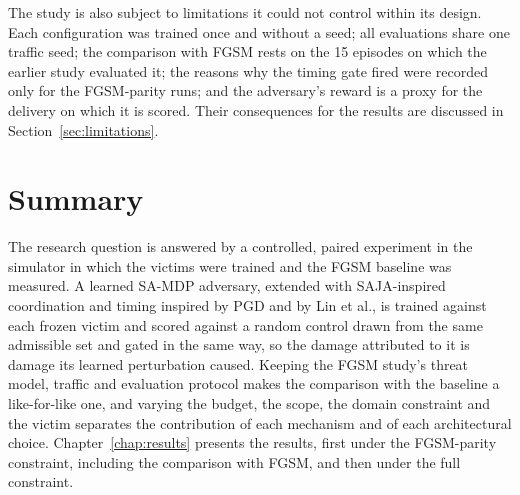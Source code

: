 The study is also subject to limitations it could not control within its design. Each
configuration was trained once and without a seed; all evaluations share one traffic
seed; the comparison with FGSM rests on the 15 episodes on which the earlier study
evaluated it; the reasons why the timing gate fired were recorded only for the
FGSM-parity runs; and the adversary's reward is a proxy for the delivery on which it is
scored. Their consequences for the results are discussed in
Section~\ref{sec:limitations}.

\section{Summary}
\label{sec:method_summary}

The research question is answered by a controlled, paired experiment in the simulator
in which the victims were trained and the FGSM baseline was measured. A learned SA-MDP
adversary, extended with SAJA-inspired coordination and timing inspired by PGD and by
Lin et al., is trained
against each frozen victim and scored against a random control drawn from the same
admissible set and gated in the same way, so the damage attributed to it is damage its
learned perturbation caused. Keeping the FGSM study's threat model, traffic and evaluation
protocol makes the comparison with the baseline a like-for-like one, and varying the
budget, the scope, the domain constraint and the victim separates the contribution of
each mechanism and of each architectural choice. Chapter~\ref{chap:results} presents the
results, first under the FGSM-parity constraint, including the comparison with FGSM, and
then under the full constraint.
